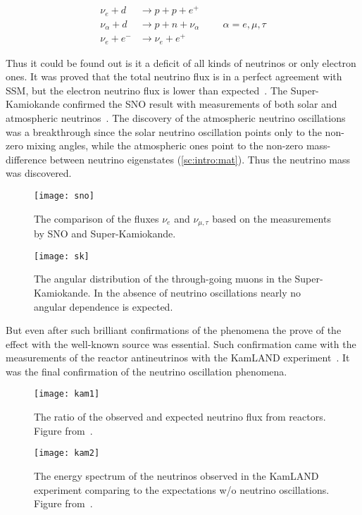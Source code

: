 \documentclass[../main.tex]{subfiles}
\begin{document}
\begin{align}
\nu_e+d&\to p+p+e^+ \\
\nu_\alpha+d&\to p+n+\nu_\alpha\hspace{1cm} \alpha =e,\mu,\tau \\
\nu_e+e^-&\to\nu_e+e^+
\end{align}

Thus it could be found out is it a deficit of all kinds of neutrinos or only electron ones. It was proved that the total neutrino flux is in a perfect agreement with SSM, but the electron neutrino flux is lower than expected~\cite{Ahmad2002}. The Super-Kamiokande confirmed the SNO result with measurements of both solar and atmospheric neutrinos~\cite{Fukuda1999}. The discovery of the atmospheric neutrino oscillations was a breakthrough since the solar neutrino oscillation points only to the non-zero mixing angles, while the atmospheric ones point to the non-zero mass-difference between neutrino eigenstates (\autoref{sc:intro:mat}). Thus the neutrino mass was discovered.

\begin{figure}
  \centering
  \begin{minipage}{0.49\linewidth}
  \centering
    \texttt{[image: sno]}
    \caption{The comparison of the fluxes $\nu_e$ and $\nu_{\mu,\tau}$ based on the measurements by SNO and Super-Kamiokande.}
    \label{fig:intro:sno}
  \end{minipage}
  \begin{minipage}{0.49\linewidth}
  \centering
    \texttt{[image: sk]}
    \caption{The angular distribution of the through-going muons in the Super-Kamiokande. In the absence of neutrino oscillations nearly no angular dependence is expected.}
    \label{fig:intro:sk}
  \end{minipage}
\end{figure}

But even after such brilliant confirmations of the phenomena the prove of the effect with the well-known source was essential. Such confirmation came with the measurements of the reactor antineutrinos with the KamLAND experiment~\cite{Eguchi2003}. It was the final confirmation of the neutrino oscillation phenomena.

\begin{figure}
  \centering
  \begin{minipage}{0.45\linewidth}
  \centering
    \texttt{[image: kam1]}
    \caption{The ratio of the observed and expected neutrino flux from reactors. Figure from~\cite{Eguchi2003}.}
    \label{fig:intro:kam1}
  \end{minipage}
  \begin{minipage}{0.45\linewidth}
  \centering
    \texttt{[image: kam2]}
    \caption{The energy spectrum of the neutrinos observed in the KamLAND experiment comparing to the expectations w/o neutrino oscillations. Figure from~\cite{Eguchi2003}.}
    \label{fig:intro:kam2}
  \end{minipage}
\end{figure}
\end{document}
